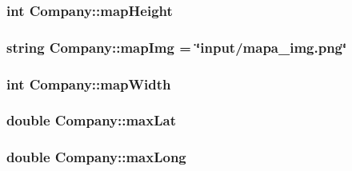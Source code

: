 \subsubsection[{map\+Height}]{\setlength{\rightskip}{0pt plus 5cm}int Company\+::map\+Height\hspace{0.3cm}{\ttfamily [protected]}}\label{class_company_abe112eeb432d183b4a2f8df955b646b4}
\hypertarget{class_company_a691baaaef44107ae1f3f948b2ccf9764}{}
\subsubsection[{map\+Img}]{\setlength{\rightskip}{0pt plus 5cm}string Company\+::map\+Img = \char`\"{}input/mapa\+\_\+img.\+png\char`\"{}\hspace{0.3cm}{\ttfamily [protected]}}\label{class_company_a691baaaef44107ae1f3f948b2ccf9764}
\hypertarget{class_company_a1f7f015a496bc006684f40425e960304}{}
\subsubsection[{map\+Width}]{\setlength{\rightskip}{0pt plus 5cm}int Company\+::map\+Width\hspace{0.3cm}{\ttfamily [protected]}}\label{class_company_a1f7f015a496bc006684f40425e960304}
\hypertarget{class_company_a0098ebc54b9f250351e4f9864c186f6d}{}
\subsubsection[{max\+Lat}]{\setlength{\rightskip}{0pt plus 5cm}double Company\+::max\+Lat\hspace{0.3cm}{\ttfamily [protected]}}\label{class_company_a0098ebc54b9f250351e4f9864c186f6d}
\hypertarget{class_company_a465bc910733fc1433f3190e735989a92}{}
\subsubsection[{max\+Long}]{\setlength{\rightskip}{0pt plus 5cm}double Company\+::max\+Long\hspace{0.3cm}{\ttfamily [protected]}}\label{class_company_a465bc910733fc1433f3190e735989a92}
\hypertarget{class_company_a2284da8a5649f448ecef4e108981095d}{}
